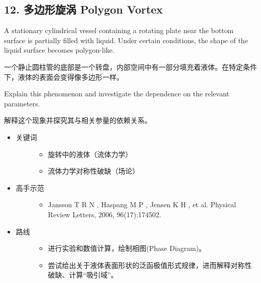 \documentclass[a4paper,10pt,english]{sphinxmanual}
\begin{document}
\subsection{12. 多边形旋涡 Polygon Vortex}
\label{\detokenize{7. Appendix:polygon-vortex}}
A stationary cylindrical vessel containing a rotating plate near the bottom surface is partially filled with liquid. Under certain conditions, the shape of the liquid surface becomes polygon-like.

一个静止圆柱管的底部是一个转盘，内部空间中有一部分填充着液体。在特定条件下，液体的表面会变得像多边形一样。

Explain this phenomenon and investigate the dependence on the relevant parameters.

解释这个现象并探究其与相关参量的依赖关系。

\noindent{}
\begin{itemize}
\item {} \begin{description}
\item[{关键词}] \leavevmode\begin{itemize}
\item {} 
旋转中的液体（流体力学）

\item {} 
流体力学对称性破缺（场论）

\end{itemize}

\end{description}

\item {} \begin{description}
\item[{高手示范}] \leavevmode\begin{itemize}
\item {} 
Jansson T R N , Haspang M P , Jensen K H , et al.  Physical Review Letters, 2006, 96(17):174502.

\end{itemize}

\end{description}

\item {} \begin{description}
\item[{路线}] \leavevmode\begin{itemize}
\item {} 
进行实验和数值计算，绘制相图(Phase Diagram)。

\item {} 
尝试给出关于液体表面形状的泛函极值形式规律，进而解释对称性破缺、计算“吸引域”。

\end{itemize}

\end{description}

\end{itemize}
\end{document}
